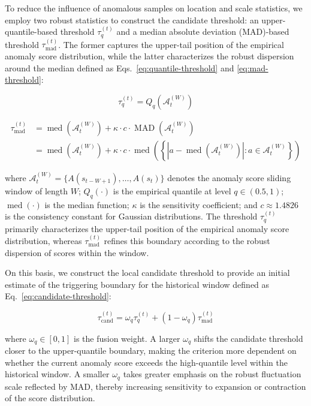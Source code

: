 \documentclass[preprint,12pt,number]{elsarticle}
\begin{document}
To reduce the influence of anomalous samples on location and scale statistics, we employ two robust statistics to construct the candidate threshold: an upper-quantile-based threshold \(\tau_q^{(t)}\) and a median absolute deviation (MAD)-based threshold \(\tau_{\mathrm{mad}}^{(t)}\). The former captures the upper-tail position of the empirical anomaly score distribution, while the latter characterizes the robust dispersion around the median defined as Eqs.~\eqref{eq:quantile-threshold} and \eqref{eq:mad-threshold}:

\[\tau_{q}^{(t)}=Q_q(\mathcal{A}_t^{(W)}) \tag{9}\label{eq:quantile-threshold}\]

\[\begin{aligned}
\tau_{\mathrm{mad}}^{(t)} &= \operatorname{med}(\mathcal{A}_t^{(W)})+\kappa \cdot c \cdot \operatorname{MAD}(\mathcal{A}_t^{(W)}) \\
&= \operatorname{med}(\mathcal{A}_t^{(W)})+\kappa \cdot c \cdot\operatorname{med}\left(\left\{\left|a-\operatorname{med}(\mathcal{A}_t^{(W)})\right|:a\in\mathcal{A}_{t}^{(W)}\right\}\right)
\end{aligned} \tag{10}\label{eq:mad-threshold}\]

\noindent where \(\mathcal{A}_t^{(W)}=\{A(s_{t-W+1}),\ldots,A(s_t)\}\) denotes the anomaly score sliding window of length \(W\); \(Q_q(\cdot)\) is the empirical quantile at level \(q\in(0.5,1)\); \(\operatorname{med}(\cdot)\) is the median function; \(\kappa\) is the sensitivity coefficient; and \(c \approx 1.4826\) is the consistency constant for Gaussian distributions. The threshold \(\tau_q^{(t)}\) primarily characterizes the upper-tail position of the empirical anomaly score distribution, whereas \(\tau_{\mathrm{mad}}^{(t)}\) refines this boundary according to the robust dispersion of scores within the window.

On this basis, we construct the local candidate threshold to provide an initial estimate of the triggering boundary for the historical window defined as Eq.~\eqref{eq:candidate-threshold}:

\[\tau_{\mathrm{cand}}^{(t)}=\omega_q\tau_q^{(t)}+(1-\omega_q)\tau_{\mathrm{mad}}^{(t)} \tag{11}\label{eq:candidate-threshold}\]

\noindent where \(\omega_q \in [0,1]\) is the fusion weight. A larger \(\omega_q\) shifts the candidate threshold closer to the upper-quantile boundary, making the criterion more dependent on whether the current anomaly score exceeds the high-quantile level within the historical window. A smaller \(\omega_q\) takes greater emphasis on the robust fluctuation scale reflected by MAD, thereby increasing sensitivity to expansion or contraction of the score distribution.
\end{document}
